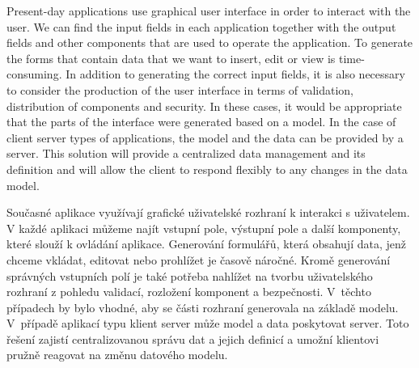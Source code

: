 \documentclass[11pt,twoside,a4paper]{book}
\begin{document}



 
\abstractpage
Present-day applications use graphical user interface in order to interact with the user. We can find the input fields in each application together with the output fields and other components that are used to operate the application. To generate the forms that contain data that we want to insert, edit or view is time-consuming. In addition to generating the correct input fields, it is also necessary to consider the production of the user interface in terms of validation, distribution of components and security. In these cases, it would be appropriate that the parts of the interface were generated based on a model. In the case of client server types of applications, the model and the data can be provided by a server. This solution will provide a centralized data management and its definition and will allow the client to respond flexibly to any changes in the data model.


\baselineskip

\noindent
Současné aplikace využívají grafické uživatelské rozhraní k interakci s uživatelem. V každé aplikaci můžeme najít vstupní pole, výstupní pole a další komponenty, které slouží k ovládání aplikace. Generování formulářů, která obsahují data, jenž chceme vkládat, editovat nebo prohlížet je časově náročné. Kromě generování správných vstupních polí je také potřeba nahlížet na tvorbu uživatelského rozhraní z pohledu validací, rozložení komponent a bezpečnosti. V~těchto případech by bylo vhodné, aby se části rozhraní generovala na základě modelu. V~případě aplikací typu klient server může model a data poskytovat server. Toto řešení zajistí centralizovanou správu dat a jejich definicí a umožní klientovi pružně reagovat na změnu datového modelu.


\tableofcontents



\listoffigures
\end{document}
